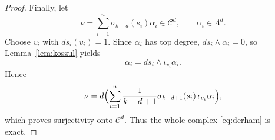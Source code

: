\documentclass[10pt,a4paper]{amsart}
\begin{document}
\begin{proof}
Finally, let
\begin{equation}
\nu=\sum_{i=1}^n \sigma_{k-d}(s_i)\alpha_i\in\mathcal C ^d,
\qquad \alpha_i\in\Lambda^d.
\end{equation}
Choose $v_i$ with $ds_i(v_i)=1$. Since $\alpha_i$ has top degree, $ds_i\wedge\alpha_i=0$, so Lemma~\ref{lem:koszul} yields
\begin{equation}
\alpha_i=ds_i\wedge\iota_{v_i}\alpha_i.
\end{equation}
Hence
\begin{equation}
\nu
=d\Bigl(\sum_{i=1}^n \frac{1}{k-d+1}\sigma_{k-d+1}(s_i)\,\iota_{v_i}\alpha_i\Bigr),
\end{equation}
which proves surjectivity onto $\mathcal C ^d$.
Thus the whole complex \eqref{eq:derham} is exact.
\end{proof}
\end{document}
